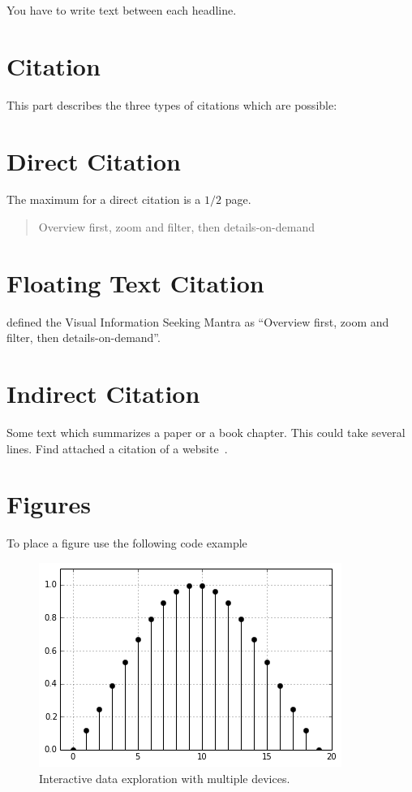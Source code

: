 You have to write text between each headline.

\section{Citation}

This part describes the three types of citations which are possible:

\section{Direct Citation}

The maximum for a direct citation is a ${1/2}$ page.

\begin{quotation}
	Overview first, zoom and filter, then details-on-demand
	\autocite{shneiderman_eyes_1996}
\end{quotation}

\section{Floating Text Citation}

\textcite{shneiderman_eyes_1996} defined the Visual Information Seeking Mantra as ``Overview first, zoom and filter, then details-on-demand''.

\section{Indirect Citation}

Some text which summarizes a paper or a book chapter. This could take several lines.
Find attached a citation of a website~\autocite{kaley_match_2018}.

\newpage
\section{Figures}

To place a figure use the following code example

\begin{figure}[ht!]
  \centering
  \includegraphics[width=1\columnwidth]{Figures/Example}
  \caption{Interactive data exploration with multiple devices.}
  \label{fig:example}
\end{figure}


